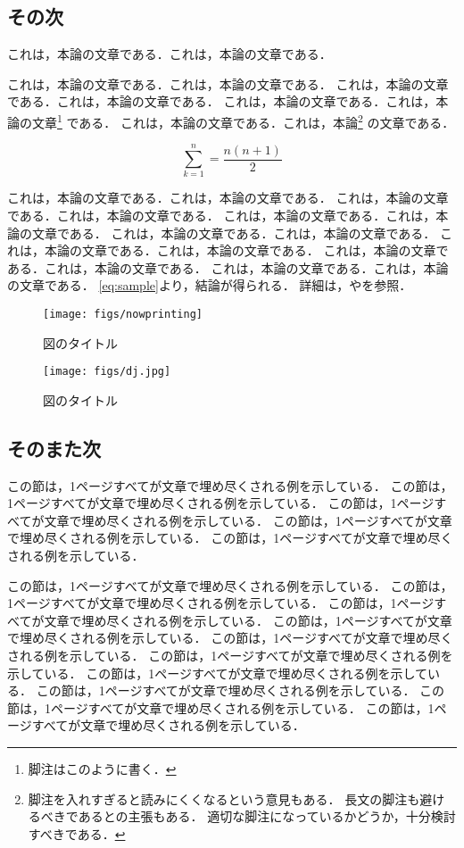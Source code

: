 \subsection{その次}

これは，本論の文章である．これは，本論の文章である．

これは，本論の文章である．これは，本論の文章である．
これは，本論の文章である．これは，本論の文章である．
これは，本論の文章である．これは，本論の文章\footnote{
脚注はこのように書く．}
である．
これは，本論の文章である．これは，本論\footnote{
脚注を入れすぎると読みにくくなるという意見もある．
長文の脚注も避けるべきであるとの主張もある．
適切な脚注になっているかどうか，十分検討すべきである．}
の文章である．

\begin{equation}\label{eq:sample}
 \sum_{k = 1}^{n} = \frac{n(n+1)}{2}
\end{equation}

これは，本論の文章である．これは，本論の文章である．
これは，本論の文章である．これは，本論の文章である．
これは，本論の文章である．これは，本論の文章である．
これは，本論の文章である．これは，本論の文章である．
これは，本論の文章である．これは，本論の文章である．
これは，本論の文章である．これは，本論の文章である．
これは，本論の文章である．これは，本論の文章である．
\eqref{eq:sample}より，結論が得られる．
詳細は，やを参照．

\begin{figure}[bth]
  \centering
  \texttt{[image: figs/nowprinting]}
  \caption{\label{figure:sample}図のタイトル}
\end{figure}
\begin{figure}[bth]
  \centering
  \texttt{[image: figs/dj.jpg]}
  \caption{\label{figure:sample2}図のタイトル}
\end{figure}

\subsection{そのまた次}

この節は，1ページすべてが文章で埋め尽くされる例を示している．
この節は，1ページすべてが文章で埋め尽くされる例を示している．
この節は，1ページすべてが文章で埋め尽くされる例を示している．
この節は，1ページすべてが文章で埋め尽くされる例を示している．
この節は，1ページすべてが文章で埋め尽くされる例を示している．

この節は，1ページすべてが文章で埋め尽くされる例を示している．
この節は，1ページすべてが文章で埋め尽くされる例を示している．
この節は，1ページすべてが文章で埋め尽くされる例を示している．
この節は，1ページすべてが文章で埋め尽くされる例を示している．
この節は，1ページすべてが文章で埋め尽くされる例を示している．
この節は，1ページすべてが文章で埋め尽くされる例を示している．
この節は，1ページすべてが文章で埋め尽くされる例を示している．
この節は，1ページすべてが文章で埋め尽くされる例を示している．
この節は，1ページすべてが文章で埋め尽くされる例を示している．
この節は，1ページすべてが文章で埋め尽くされる例を示している．

